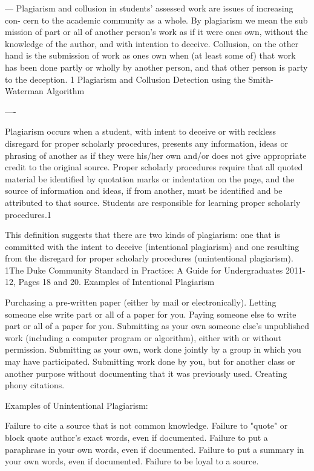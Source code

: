 ---
Plagiarism and collusion in students' assessed work are issues of increasing con- cern to the academic community as a whole. By plagiarism we mean the sub mission of part or all of another person's work as if it were ones own, without the knowledge of the author, and with intention to deceive. Collusion, on the other hand is the submission of work as ones own when (at least some of) that work has been done partly or wholly by another person, and that other person is party to the deception.
1
Plagiarism and Collusion Detection using the Smith-Waterman Algorithm

----

    Plagiarism occurs when a student, with intent to deceive or with reckless disregard for proper scholarly procedures, presents any information, ideas or phrasing of another as if they were his/her own and/or does not give appropriate credit to the original source. Proper scholarly procedures require that all quoted material be identified by quotation marks or indentation on the page, and the source of information and ideas, if from another, must be identified and be attributed to that source. Students are responsible for learning proper scholarly procedures.1

This definition suggests that there are two kinds of plagiarism: one that is committed with the intent to deceive (intentional plagiarism) and one resulting from the disregard for proper scholarly procedures (unintentional plagiarism).
1The Duke Community Standard in Practice: A Guide for Undergraduates 2011-12, Pages 18 and 20.
Examples of Intentional Plagiarism

    Purchasing a pre-written paper (either by mail or electronically).
    Letting someone else write part or all of a paper for you.
    Paying someone else to write part or all of a paper for you.
    Submitting as your own someone else's unpublished work (including a computer program or algorithm), either with or without permission.
    Submitting as your own, work done jointly by a group in which you may have participated.
    Submitting work done by you, but for another class or another purpose without documenting that it was previously used.
    Creating phony citations.


Examples of Unintentional Plagiarism:

    Failure to cite a source that is not common knowledge.
    Failure to "quote" or block quote author's exact words, even if documented.
    Failure to put a paraphrase in your own words, even if documented.
    Failure to put a summary in your own words, even if documented.
    Failure to be loyal to a source.



